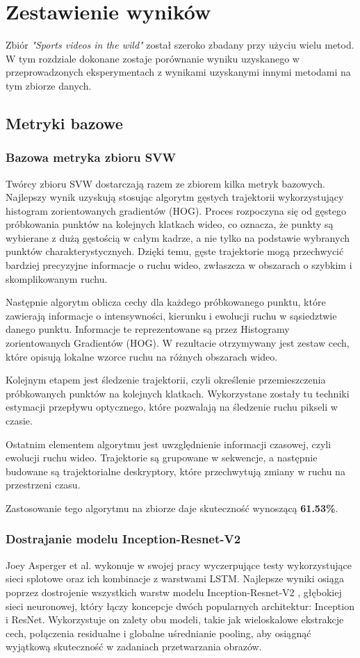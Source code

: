 \newpage
\section{Zestawienie wyników}
Zbiór \textit{"Sports videos in the wild"} \cite{svw} został szeroko zbadany przy użyciu wielu metod. W tym rozdziale dokonane zostaje porównanie wyniku uzyskanego w przeprowadzonych eksperymentach z wynikami uzyskanymi innymi metodami na tym zbiorze danych. 
\subsection{Metryki bazowe}
\subsubsection{Bazowa metryka zbioru SVW}
Twórcy zbioru SVW \cite{svw} dostarczają razem ze zbiorem kilka metryk bazowych. Najlepszy wynik uzyskują stosując algorytm gęstych trajektorii wykorzystujący histogram zorientowanych gradientów (HOG). Proces rozpoczyna się od gęstego próbkowania punktów na kolejnych klatkach wideo, co oznacza, że punkty są wybierane z dużą gęstością w całym kadrze, a nie tylko na podstawie wybranych punktów charakterystycznych. Dzięki temu, gęste trajektorie mogą przechwycić bardziej precyzyjne informacje o ruchu wideo, zwłaszcza w obszarach o szybkim i skomplikowanym ruchu.

Następnie algorytm oblicza cechy dla każdego próbkowanego punktu, które zawierają informacje o intensywności, kierunku i ewolucji ruchu w sąsiedztwie danego punktu. Informacje te reprezentowane są przez Histogramy zorientowanych Gradientów (HOG). W rezultacie otrzymywany jest zestaw cech, które opisują lokalne wzorce ruchu na różnych obszarach wideo.

Kolejnym etapem jest śledzenie trajektorii, czyli określenie przemieszczenia próbkowanych punktów na kolejnych klatkach. Wykorzystane zostały tu techniki estymacji przepływu optycznego, które pozwalają na śledzenie ruchu pikseli w czasie. 

Ostatnim elementem algorytmu jest uwzględnienie informacji czasowej, czyli ewolucji ruchu wideo. Trajektorie są grupowane w sekwencje, a następnie budowane są trajektorialne deskryptory, które przechwytują zmiany w ruchu na przestrzeni czasu.

Zastosowanie tego algorytmu na zbiorze daje skuteczność wynoszącą \textbf{61.53\%}. 

\subsubsection{Dostrajanie modelu Inception-Resnet-V2}
Joey Asperger et al. \cite{cnn-joey} wykonuje w swojej pracy wyczerpujące testy wykorzystujące sieci splotowe oraz ich kombinacje z warstwami LSTM. Najlepsze wyniki osiąga poprzez dostrojenie wszystkich warstw modelu Inception-Resnet-V2 \cite{inception-resnet-v2}, głębokiej sieci neuronowej, który łączy koncepcje dwóch popularnych architektur: Inception i ResNet. Wykorzystuje on zalety obu modeli, takie jak wieloskalowe ekstrakcje cech, połączenia residualne i globalne uśrednianie pooling, aby osiągnąć wyjątkową skuteczność w zadaniach przetwarzania obrazów. 


